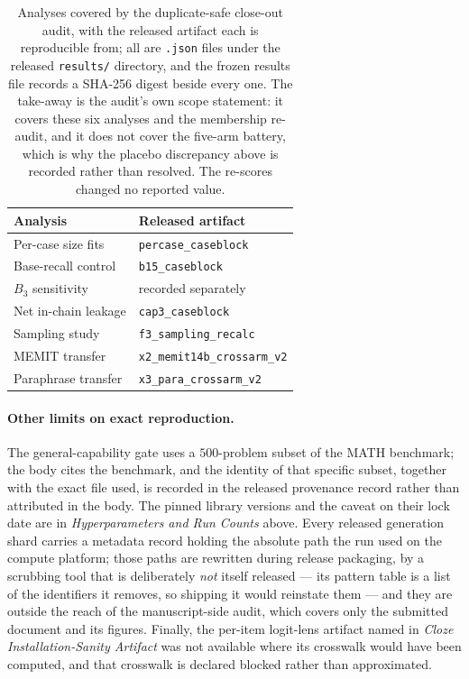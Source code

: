 \documentclass[letterpaper]{article}
\begin{document}
\begin{table}[t]
\centering
\small
\begin{tabular}{@{}ll@{}}
\toprule
Analysis & Released artifact \\
\midrule
Per-case size fits    & \texttt{percase\_\allowbreak caseblock} \\
Base-recall control   & \texttt{b15\_\allowbreak caseblock} \\
\quad \(B_3\) sensitivity & recorded separately \\
Net in-chain leakage  & \texttt{cap3\_\allowbreak caseblock} \\
Sampling study        & \texttt{f3\_\allowbreak sampling\_\allowbreak recalc} \\
MEMIT transfer        & \texttt{x2\_\allowbreak memit14b\_\allowbreak crossarm\_v2} \\
Paraphrase transfer   & \texttt{x3\_\allowbreak para\_\allowbreak crossarm\_v2} \\
\bottomrule
\end{tabular}
\caption{Analyses covered by the duplicate-safe close-out audit, with the
released artifact each is reproducible from; all are \texttt{.json} files under
the released \texttt{results/} directory, and the frozen results file records a
SHA-256 digest beside every one.  The take-away is the audit's own scope
statement: it covers these six analyses and the membership re-audit, and it does
not cover the five-arm battery, which is why the placebo discrepancy above is
recorded rather than resolved.  The re-scores changed no reported value.}
\label{tab:s10-closeout}
\end{table}

\paragraph{Other limits on exact reproduction.}
The general-capability gate uses a \(500\)-problem subset of the MATH benchmark;
the body cites the benchmark, and the identity of that specific subset, together
with the exact file used, is recorded in the released provenance record rather
than attributed in the body.  The pinned library versions and the caveat on
their lock date are in \emph{Hyperparameters and Run Counts} above.  Every released generation
shard carries a metadata record holding the absolute path the run used on the
compute platform; those paths are rewritten during release packaging, by a
scrubbing tool that is deliberately \emph{not} itself released --- its pattern
table is a list of the identifiers it removes, so shipping it would reinstate
them --- and they are outside the reach of the manuscript-side audit,
which covers only the submitted document and its figures.  Finally, the per-item
logit-lens artifact named in \emph{Cloze Installation-Sanity Artifact} was not
available where its
crosswalk would have been computed, and that crosswalk is declared blocked rather
than approximated.
\end{document}
